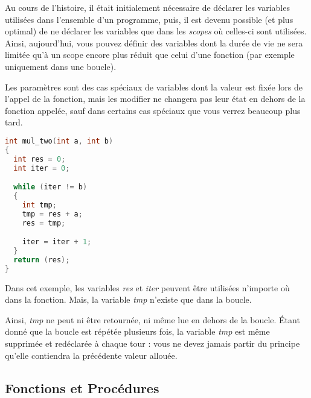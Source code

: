 \documentclass[11pt,a4paper]{article}
\begin{document}
\medskip

Au cours de l'histoire, il était initialement nécessaire de déclarer les variables utilisées dans l'ensemble d'un programme, puis, il est devenu possible (et plus optimal) de ne déclarer les variables que dans les \textit{scopes} où celles-ci sont utilisées.
Ainsi, aujourd'hui, vous pouvez définir des variables dont la durée de vie ne sera limitée qu'à un scope encore plus réduit que celui d'une fonction (par exemple uniquement dans une boucle).

\medskip

Les paramètres sont des cas spéciaux de variables dont la valeur est fixée lors de l'appel de la fonction, mais les modifier ne changera pas leur état en dehors de la fonction appelée, sauf dans certains cas spéciaux que vous verrez beaucoup plus tard.

\begin{table}[ht!]
  \centering
  \begin{minipage}{0.4\textwidth}
    \centering

\begin{lstlisting}[language=C]
int mul_two(int a, int b)
{
  int res = 0;
  int iter = 0;

  while (iter != b)
  {
    int tmp;
    tmp = res + a;
    res = tmp;

    iter = iter + 1;
  }
  return (res);
} \end{lstlisting}

  \end{minipage}
  \hfillx
  \begin{minipage}{0.55\textwidth}
Dans cet exemple, les variables \textit{res} et \textit{iter} peuvent être utilisées n'importe où dans la fonction.
Mais, la variable \textit{tmp} n'existe que dans la boucle.

\medskip

Ainsi, \textit{tmp} ne peut ni être retournée, ni même lue en dehors de la boucle.
\'Etant donné que la boucle est répétée plusieurs fois, la variable \textit{tmp} est même supprimée et redéclarée à chaque tour : vous ne devez jamais partir du principe qu'elle contiendra la précédente valeur allouée.
  \end{minipage}
\end{table}



\subsection{Fonctions et Procédures}
\end{document}
